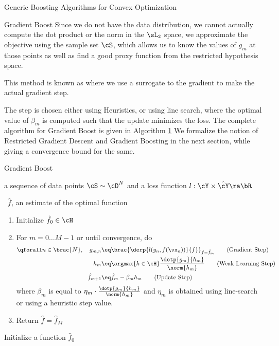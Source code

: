 \documentclass{article}
\begin{document}
\begin{psection}{Generic Boosting Algorithms for Convex Optimization}
\begin{psubsection}{Gradient Boost}
		Since we do not have the data distribution, we cannot actually compute the dot product or the norm in the $\sL_2$ space, we approximate the objective using the sample set $\cS$, which allows us to know the values of $g_m$ at those points as well as find a good proxy function from the restricted hypothesis space.

		This method is known as  where we use a surrogate to the gradient to make the actual gradient step.

		The step is chosen either using Heuristics, or using line search, where the optimal value of $\beta_m$ is computed such that the update minimizes the loss. The complete algorithm for Gradient Boost is given in Algorithm \hyperlink{algo:1}{1} We formalize the notion of Restricted Gradient Descent and Gradient Boosting in the next section, while giving a convergence bound for the same.

	\end{psubsection}

	\begin{algo}[0.8\textwidth]{Gradient Boost}

		 \quad a sequence of data points $\cS \sim \cD^N$ and a loss function $l : \cY \times \hat{\cY} \ra \bR$ \sbr

		\, $\hat{f}$, an estimate of the optimal function


		\begin{enumerate}
			\item Initialize $\hat{f}_0 \in \cH$
			\item For $m = 0 \dots M - 1$ or until convergence, do
				\begin{align}
					\qforall n \in \brac{N}, \quad g_{m, n}	&\eq	\brac{\derp{l(y_n, f(\vx_n))}{f}}_{f = \hat{f}_{m}} \tag{Gradient Step} \\
					h_m										&\eq	\argmax{h \in \cH} \frac{\dotp{g_m}{h_m}}{\norm{h_m}} \tag{Weak Learning Step} \\
					\hat{f}_{m + 1}							&\eq	\hat{f}_m - \beta_m h_m \tag{Update Step}
				\end{align}
				where $\beta_m$ is equal to $\eta_m \cdot \frac{\dotp{g_m}{h_m}}{\norm{h_m}}$ and $\eta_m$ is obtained using line-search or using a heuristic step value.
			\item Return $\hat{f} = \hat{f}_M$
		\end{enumerate}
		Initialize a function $\hat{f}_0$


\end{algo}
\end{psection}
\end{document}
